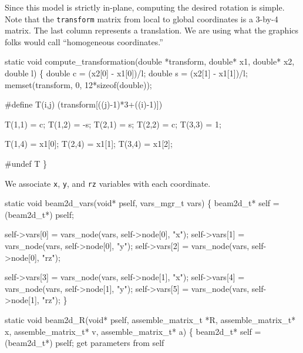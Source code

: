 Since this model is strictly in-plane, computing the desired
rotation is simple.  Note that the {\tt{}transform} matrix from
local to global coordinates is a 3-by-4 matrix.  The last
column represents a translation.  We are using
what the graphics folks would call ``homogeneous coordinates.''

\nwenddocs{}\plusendmoddef
static void compute_transformation(double *transform,
                                   double* x1, double* x2, double l)
\{
    double c = (x2[0] - x1[0])/l;
    double s = (x2[1] - x1[1])/l;
    memset(transform, 0, 12*sizeof(double));

    #define T(i,j) (transform[((j)-1)*3+((i)-1)])

    T(1,1) =  c;
    T(1,2) = -s;
    T(2,1) =  s;
    T(2,2) =  c;
    T(3,3) =  1;

    T(1,4) = x1[0];
    T(2,4) = x1[1];
    T(3,4) = x1[2];

    #undef T
\}

\nwendcode{}\nwdocspar

We associate {\tt{}x}, {\tt{}y}, and {\tt{}rz} variables with each coordinate.

\nwenddocs{}\plusendmoddef
static void beam2d_vars(void* pself, vars_mgr_t vars)
\{
    beam2d_t* self = (beam2d_t*) pself;

    self->vars[0] = vars_node(vars, self->node[0], "x");
    self->vars[1] = vars_node(vars, self->node[0], "y");
    self->vars[2] = vars_node(vars, self->node[0], "rz");

    self->vars[3] = vars_node(vars, self->node[1], "x");
    self->vars[4] = vars_node(vars, self->node[1], "y");
    self->vars[5] = vars_node(vars, self->node[1], "rz");
\}

\nwendcode{}\nwdocspar

\nwenddocs{}\plusendmoddef
static void beam2d_R(void* pself, assemble_matrix_t *R, 
                     assemble_matrix_t* x,
                     assemble_matrix_t* v,
                     assemble_matrix_t* a)
\{
    beam2d_t* self = (beam2d_t*) pself;
    \LA{}get parameters from \code{}self\edoc{}~{\nwtagstyle{}}\RA{}

